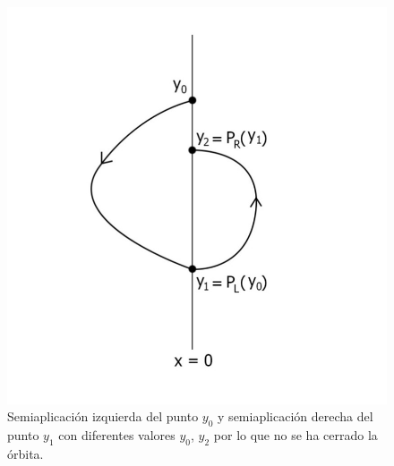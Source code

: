 \documentclass[12pt,a4paper]{report} %
\begin{document}
	 \begin{figure}[h]
		\centering
		\includegraphics[width=1.1\textwidth,center]{aplipoincareLR.jpg}
		\caption{Semiaplicación izquierda del punto $y_0$ y semiaplicación derecha del punto $y_1$ con diferentes valores $y_0$, $y_2$ por lo que no se ha cerrado la órbita.}
		\label{fig:aplipoincareLR}
	\end{figure}\smallskip
	
	\newpage
	
\end{document}
